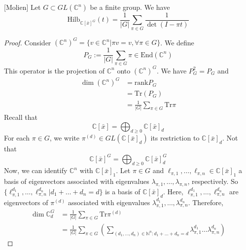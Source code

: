 \documentclass[envcountsame,envcountchap]{svmono}
\begin{document}
\begin{theorem}\label{Molien} [Molien]
Let $G \subset GL(\mathbb{C}^n)$ be a finite group. We have
\begin{equation}
\text{Hilb}_{\mathbb{C}[\bar{x}]^G} (t) = \frac{1}{|G|} \sum_{\pi \in G} \frac{1}{\det (I- \pi t )}
\end{equation}
\end{theorem}
\begin{proof}
Consider $(\mathbb{C}^n)^G = \{v \in \mathbb{C}^n | \pi v = v , \forall \pi \in G \}$. We define 
\begin{equation}
P_G := \frac{1}{|G|} \sum_{\pi \in G} \pi \in \text{End}(\mathbb{C}^n)
\end{equation} This operator is the projection of $\mathbb{C}^n$ onto $(\mathbb{C}^n)^G$. We have $P_G^2 = P_G$ and 
\begin{equation}
\begin{split}
\dim (\mathbb{C}^n)^G &= \text{rank} P_G \\
&= \text{Tr} (P_G) \\
&= \frac{1}{|G|} \sum_{\pi \in G} \text{Tr} \pi 
\end{split}
\end{equation} Recall that
\begin{equation}
\mathbb{C}[\bar{x}] = \bigoplus_{d\ge0} \mathbb{C}[\bar{x}]_d
\end{equation} For each $\pi \in G$, we write $\pi^{(d)} \in GL(\mathbb{C}[\bar{x}]_d )$ its restriction to $\mathbb{C}[\bar{x}]_d$. Not that
 \begin{equation}
 \mathbb{C}[\bar{x}]^G = \bigoplus_{d\ge0} \mathbb{C}[\bar{x}]_d^G
 \end{equation} Now, we can identify $\mathbb{C}^n$ with $\mathbb{C}[\bar{x}]_1$. Let $\pi \in G$ and $\ell_{\pi, 1}, \ldots , \ell_{\pi, n} \in \mathbb{C}[\bar{x}]_1$ a basis of eigenvectors associated with eigenvalues $\lambda_{\pi, 1}, \ldots , \lambda_{\pi, n}$, respectively. So $\{ \ell_{\pi,1}^{d_1}, \ldots , \ell_{\pi,n}^{d_n} |d_1 + \ldots + d_n = d \}$ is a basis of $\mathbb{C}[\bar{x}]_d$. Here, $ \ell_{\pi,1}^{d_1}, \ldots , \ell_{\pi,n}^{d_n}$ are eigenvectors of $\pi^{(d)}$ associated with eigenvalues $\lambda_{\pi, 1}^{d_1}, \ldots ,\lambda_{\pi, n}^{d_n}$. Therefore,
 \begin{equation}
 \begin{split}
 \dim \mathbb{C}_d^G &= \frac{1}{|G|} \sum_{\pi \in G} \text{Tr} \pi^{(d)} \\
 &= \frac{1}{|G|} \sum_{\pi \in G} \left( \sum_{(d_1, \ldots , d_n) \in\mathbb{N}^n: d_1 + \ldots + d_n = d} \lambda_{\pi, 1}^{d_1} \ldots \lambda_{\pi, n}^{d_n} \right)

\end{split}
\end{equation}
\end{proof}
\end{document}

